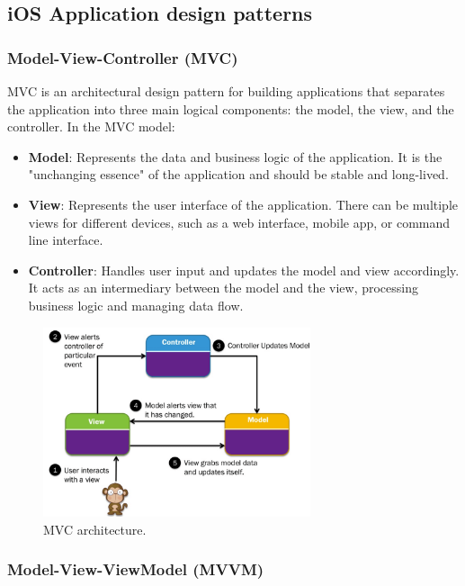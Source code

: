 \subsection{iOS Application design patterns}

\subsubsection{Model-View-Controller (MVC)}

MVC is an architectural design pattern for building applications that separates the application into three main logical components: the model, the view, and the controller. In the MVC model:

\begin{itemize}
    \item \textbf{Model}: Represents the data and business logic of the application. It is the "unchanging essence" of the application and should be stable and long-lived.

    \item \textbf{View}: Represents the user interface of the application. There can be multiple views for different devices, such as a web interface, mobile app, or command line interface.

    \item \textbf{Controller}: Handles user input and updates the model and view accordingly. It acts as an intermediary between the model and the view, processing business logic and managing data flow.
\end{itemize}

\begin{figure}[H]
    \centering
    \includegraphics[width=0.7\textwidth]{assets/images/Research/System/MVC.png}
    \caption{MVC architecture.}
    \label{fig:mvc}
\end{figure}

\subsubsection{Model-View-ViewModel (MVVM)}

